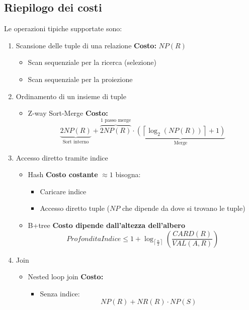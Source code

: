 \documentclass[a4paper]{article}
\begin{document}
\subsection{Riepilogo dei costi}
Le operazioni tipiche supportate sono:
\begin{enumerate}
  \item Scansione delle tuple di una relazione \textbf{Costo: } \( NP(R) \) 
    \begin{itemize}
      \item Scan sequenziale per la ricerca (selezione)
      \item Scan sequenziale per la proiezione
    \end{itemize}

  \item Ordinamento di un insieme di tuple
    \begin{itemize}
      \item Z-way Sort-Merge \textbf{Costo: }
        \[
          \underbrace{2 NP(R)}_{\text{Sort interno}}
          + \overbrace{2NP(R)}^{\text{1 passo merge}}
          \cdot
          \underbrace{\left(
          \left\lceil \log_2(NP(R)) \right\rceil + 1
      \right)}_{\text{Merge}}
        \]
    \end{itemize}

  \item Accesso diretto tramite indice
    \begin{itemize}
      \item Hash \textbf{Costo costante} \( \approx 1 \) bisogna:
        \begin{itemize}
          \item Caricare indice
          \item Accesso diretto tuple (\( NP \) che dipende da dove si trovano le tuple)
        \end{itemize}

      \item B+tree \textbf{Costo dipende dall'altezza dell'albero}
        \[
          ProfonditaIndice \le 1 + \log_{\left\lceil \frac{n}{2} \right\rceil }
          \left( \frac{CARD(R)}{VAL(A,R)} \right)
        \] 
    \end{itemize}

  \item Join
    \begin{itemize}
      \item Nested loop join \textbf{Costo: }
        \begin{itemize}
          \item Senza indice:
            \[
              NP(R) + NR(R) \cdot NP(S)
            \] 


\end{itemize}
\end{itemize}
\end{enumerate}
\end{document}
